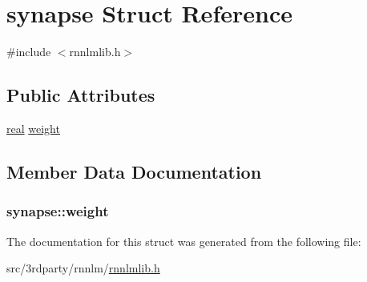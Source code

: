 \hypertarget{structsynapse}{}\section{synapse Struct Reference}
\label{structsynapse}


{\ttfamily \#include $<$rnnlmlib.\+h$>$}

\subsection*{Public Attributes}
\begin{DoxyCompactItemize}
\item 
\hyperlink{rnnlmlib_8h_a11d147c64891830c9e79b3315b1b2e21}{real} \hyperlink{structsynapse_ad998e3353c0f4fbc7b477cd49df4b906}{weight}
\end{DoxyCompactItemize}


\subsection{Member Data Documentation}
\subsubsection[{weight}]{ synapse\+::weight}\hypertarget{structsynapse_ad998e3353c0f4fbc7b477cd49df4b906}{}\label{structsynapse_ad998e3353c0f4fbc7b477cd49df4b906}


The documentation for this struct was generated from the following file\+:\begin{DoxyCompactItemize}
\item 
src/3rdparty/rnnlm/\hyperlink{rnnlmlib_8h}{rnnlmlib.\+h}\end{DoxyCompactItemize}
